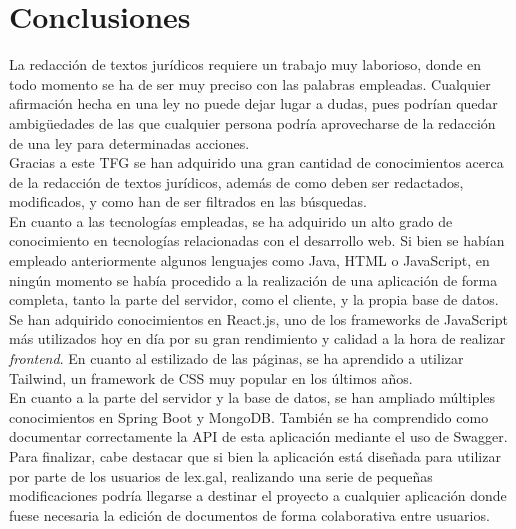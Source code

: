 \section{Conclusiones}

La redacción de textos jurídicos requiere un trabajo muy laborioso, donde en todo momento se ha de ser muy preciso con las palabras empleadas. Cualquier afirmación hecha en una ley no puede dejar lugar a dudas, pues podrían quedar ambigüedades de las que cualquier persona podría aprovecharse de la redacción de una ley para determinadas acciones.
\\

Gracias a este TFG se han adquirido una gran cantidad de conocimientos acerca de la redacción de textos jurídicos, además de como deben ser redactados, modificados, y como han de ser filtrados en las búsquedas.
\\

En cuanto a las tecnologías empleadas, se ha adquirido un alto grado de conocimiento en tecnologías relacionadas con el desarrollo web. Si bien se habían empleado anteriormente algunos lenguajes como Java, HTML o JavaScript, en ningún momento se había procedido a la realización de una aplicación de forma completa, tanto la parte del servidor, como el cliente, y la propia base de datos.
\\

Se han adquirido conocimientos en React.js, uno de los frameworks de JavaScript más utilizados hoy en día por su gran rendimiento y calidad a la hora de realizar {\it frontend}. En cuanto al estilizado de las páginas, se ha aprendido a utilizar Tailwind, un framework de CSS muy popular en los últimos años.
\\

En cuanto a la parte del servidor y la base de datos, se han ampliado múltiples conocimientos en Spring Boot y MongoDB. También se ha comprendido como documentar correctamente la API de esta aplicación mediante el uso de Swagger.
\\

Para finalizar, cabe destacar que si bien la aplicación está diseñada para utilizar por parte de los usuarios de lex.gal, realizando una serie de pequeñas modificaciones podría llegarse a destinar el proyecto a cualquier aplicación donde fuese necesaria la edición de documentos de forma colaborativa entre usuarios.